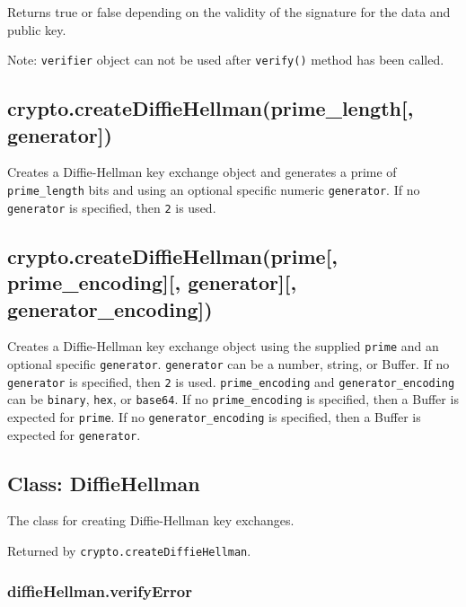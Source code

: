 Returns true or false depending on the validity of the signature for the
data and public key.

Note: \texttt{verifier} object can not be used after \texttt{verify()}
method has been called.

\subsection{crypto.createDiffieHellman(prime\_length{[},
generator{]})}\label{crypto.creatediffiehellmanprimeux5flength-generator}

Creates a Diffie-Hellman key exchange object and generates a prime of
\texttt{prime\_length} bits and using an optional specific numeric
\texttt{generator}. If no \texttt{generator} is specified, then
\texttt{2} is used.

\subsection{crypto.createDiffieHellman(prime{[}, prime\_encoding{]}{[},
generator{]}{[},
generator\_encoding{]})}\label{crypto.creatediffiehellmanprime-primeux5fencoding-generator-generatorux5fencoding}

Creates a Diffie-Hellman key exchange object using the supplied
\texttt{prime} and an optional specific \texttt{generator}.
\texttt{generator} can be a number, string, or Buffer. If no
\texttt{generator} is specified, then \texttt{2} is used.
\texttt{prime\_encoding} and \texttt{generator\_encoding} can be
\texttt{\textquotesingle{}binary\textquotesingle{}},
\texttt{\textquotesingle{}hex\textquotesingle{}}, or
\texttt{\textquotesingle{}base64\textquotesingle{}}. If no
\texttt{prime\_encoding} is specified, then a Buffer is expected for
\texttt{prime}. If no \texttt{generator\_encoding} is specified, then a
Buffer is expected for \texttt{generator}.

\subsection{Class: DiffieHellman}\label{class-diffiehellman}

The class for creating Diffie-Hellman key exchanges.

Returned by \texttt{crypto.createDiffieHellman}.

\subsubsection{diffieHellman.verifyError}\label{diffiehellman.verifyerror}

